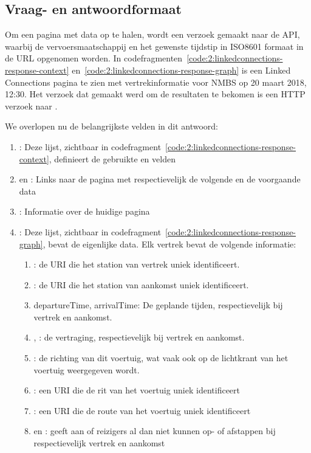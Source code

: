 \subsection{Vraag- en antwoordformaat}
Om een pagina met data op te halen, wordt een verzoek gemaakt naar de API, waarbij de vervoersmaatschappij en het gewenste tijdstip in ISO8601 formaat in de URL opgenomen worden. In codefragmenten~\ref{code:2:linkedconnections-response-context} en~\ref{code:2:linkedconnections-response-graph} is een Linked Connections pagina te zien met vertrekinformatie voor NMBS op 20 maart 2018, 12:30. Het verzoek dat gemaakt werd om de resultaten te bekomen is een HTTP verzoek naar .

We overlopen nu de belangrijkste velden in dit antwoord:
\begin{enumerate}
	\item {}: Deze lijst, zichtbaar in codefragment~\ref{code:2:linkedconnections-response-context}, definieert de gebruikte  en velden
	\item {} en  : Links naar de pagina met respectievelijk de volgende en de voorgaande data
	\item {}: Informatie over de huidige pagina
	\item {}: Deze lijst, zichtbaar in codefragment~\ref{code:2:linkedconnections-response-graph},  bevat de eigenlijke data. Elk vertrek bevat de volgende informatie:
	\begin{enumerate}
			\item {}: de URI die het station van vertrek uniek identificeert.
			\item {}: de URI die het station van aankomst uniek identificeert.	\item departureTime, arrivalTime: De geplande tijden, respectievelijk bij vertrek en aankomst.
			\item {}, : de vertraging, respectievelijk bij vertrek en aankomst.
			\item {}: de richting van dit voertuig, wat vaak ook op de lichtkrant van het voertuig weergegeven wordt.
			\item {}: een URI die de rit van het voertuig uniek identificeert
			\item {}: een URI die de route van het voertuig uniek identificeert
			\item {} en : geeft aan of reizigers al dan niet kunnen op- of afstappen bij respectievelijk vertrek en aankomst
	\end{enumerate}
\end{enumerate}

